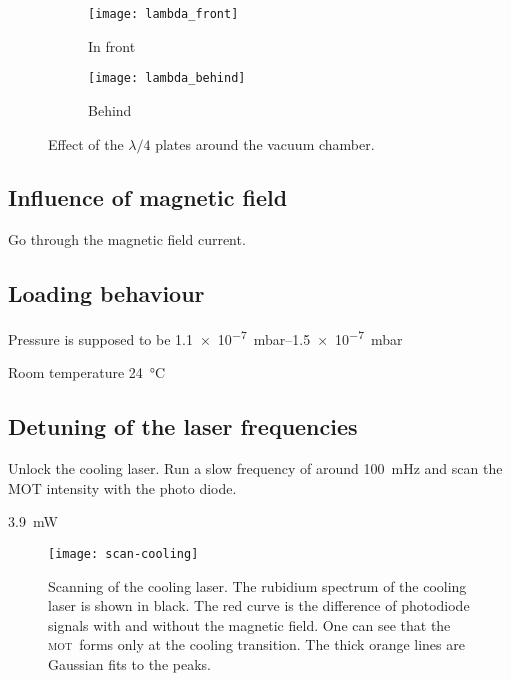 \documentclass[11pt, english, fleqn, DIV=15, headinclude, BCOR=2cm]{scrreprt}
\newcommand\mot{\textsc{mot}}
\begin{document}
\begin{figure}
    \centering
    \begin{subfigure}[c]{0.48\linewidth}
    \centering
    \texttt{[image: lambda\_front]}
    \caption{%
        In front
    }
    \label{fig:lambda_front}
    \end{subfigure}
    \hfill
    \begin{subfigure}[c]{0.48\linewidth}
    \centering
    \texttt{[image: lambda\_behind]}
    \caption{%
        Behind
    }
    \label{fig:lambda_behind}
    \end{subfigure}
    \caption{%
        Effect of the $\lambda/4$ plates around the vacuum chamber.
    }
    \label{fig:}
\end{figure}

\subsection{Influence of magnetic field}

Go through the magnetic field current.


\subsection{Loading behaviour}

Pressure is supposed to be \SIrange{1.1e-7}{1.5e-7}{\milli\bar}

Room temperature \SI{24}{\celsius}

\subsection{Detuning of the laser frequencies}

Unlock the cooling laser. Run a slow frequency of around \SI{100}{\milli\hertz}
and scan the MOT intensity with the photo diode. 

\SI{3.9}{\milli\watt}

\begin{figure}
    \centering
    \texttt{[image: scan-cooling]}
    \caption{%
        Scanning of the cooling laser. The rubidium spectrum of the cooling
        laser is shown in black. The red curve is the difference of photodiode
        signals with and without the magnetic field. One can see that the \mot\
        forms only at the cooling transition. The thick orange lines are
        Gaussian fits to the peaks.
    }
    \label{fig:scan-cooling}
\end{figure}
\end{document}
